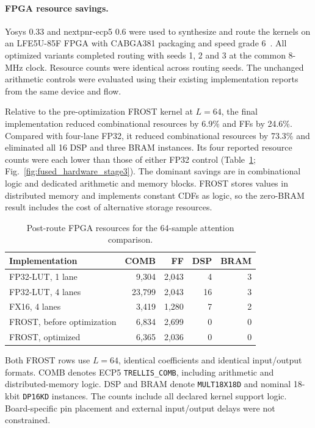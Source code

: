 \paragraph{FPGA resource savings.}
Yosys 0.33 and nextpnr-ecp5 0.6 were used to synthesize and route the
kernels on an LFE5U-85F FPGA with CABGA381 packaging and speed
grade 6~\cite{yosysSoftware,nextpnrSoftware}. All optimized variants
completed routing with seeds 1, 2 and 3 at the common 8-MHz clock.
Resource counts were identical across routing seeds. The unchanged
arithmetic controls were evaluated using their existing implementation
reports from the same device and flow.

Relative to the pre-optimization FROST kernel at $L=64$, the final
implementation reduced combinational resources by 6.9\% and FFs by
24.6\%. Compared with four-lane FP32, it reduced combinational resources
by 73.3\% and eliminated all 16 DSP and three BRAM instances.
Its four reported resource counts were each lower than those of
either FP32 control (Table~\ref{tab:fused_fpga_resources};
Fig.~\ref{fig:fused_hardware_stage3}).
The dominant savings are in combinational logic and dedicated
arithmetic and memory blocks.
FROST stores values in distributed memory and implements constant CDFs
as logic, so the zero-BRAM result includes the cost of alternative
storage resources.

\begin{table}[!htbp]
\centering
\caption{Post-route FPGA resources for the 64-sample attention comparison.}
\label{tab:fused_fpga_resources}
\small
\setlength{\tabcolsep}{4pt}
\begin{tabular*}{\linewidth}{@{\extracolsep{\fill}}lrrrr@{}}
\toprule
Implementation & COMB & FF & DSP & BRAM \\
\midrule
FP32-LUT, 1 lane & 9,304 & 2,043 & 4 & 3 \\
FP32-LUT, 4 lanes & 23,799 & 2,043 & 16 & 3 \\
FX16, 4 lanes & 3,419 & 1,280 & 7 & 2 \\
FROST, before optimization & 6,834 & 2,699 & 0 & 0 \\
FROST, optimized & 6,365 & 2,036 & 0 & 0 \\
\bottomrule
\end{tabular*}
\par\smallskip\footnotesize
Both FROST rows use $L=64$, identical coefficients and identical
input/output formats. COMB denotes ECP5 \texttt{TRELLIS\_COMB}, including
arithmetic and distributed-memory logic. DSP and BRAM denote
\texttt{MULT18X18D} and nominal 18-kbit \texttt{DP16KD} instances.
The counts include all declared kernel support logic. Board-specific
pin placement and external input/output delays were not constrained.
\end{table}

